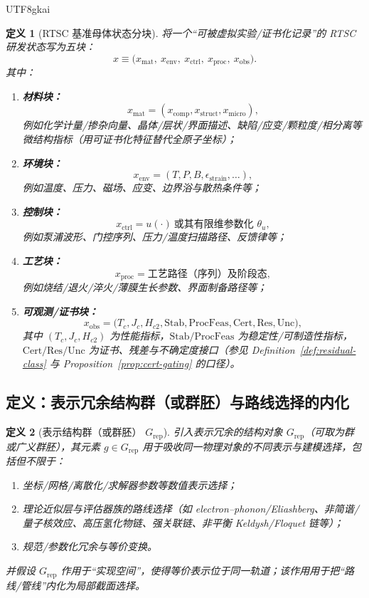 \documentclass[12pt]{article}
\newtheorem{definition}{定义}[section]
\newcommand{\RTSC}{\textsf{RTSC}}
\begin{document}
\begin{CJK*}{UTF8}{gkai}
\begin{definition}[RTSC 基准母体状态分块]
\label{def:rtsc-benchmark-blocks}
将一个“可被虚拟实验/证书化记录”的 \RTSC{} 研发状态写为五块：
\[
x
\equiv
\bigl(
x_{\mathrm{mat}},\ x_{\mathrm{env}},\ x_{\mathrm{ctrl}},\ x_{\mathrm{proc}},\ x_{\mathrm{obs}}
\bigr).
\]
其中：
\begin{enumerate}
  \item \textbf{材料块：}
  \[
  x_{\mathrm{mat}}=(x_{\mathrm{comp}},x_{\mathrm{struct}},x_{\mathrm{micro}}),
  \]
  例如化学计量/掺杂向量、晶体/层状/界面描述、缺陷/应变/颗粒度/相分离等微结构指标（用可证书化特征替代全原子坐标）；
  \item \textbf{环境块：}
  \[
  x_{\mathrm{env}}=(T,P,B,\epsilon_{\mathrm{strain}},\ldots),
  \]
  例如温度、压力、磁场、应变、边界浴与散热条件等；
  \item \textbf{控制块：}
  \[
  x_{\mathrm{ctrl}}=u(\cdot)\ \text{或其有限维参数化 }\theta_u,
  \]
  例如泵浦波形、门控序列、压力/温度扫描路径、反馈律等；
  \item \textbf{工艺块：}
  \[
  x_{\mathrm{proc}}=\text{工艺路径（序列）及阶段态},
  \]
  例如烧结/退火/淬火/薄膜生长参数、界面制备路径等；
  \item \textbf{可观测/证书块：}
  \[
  x_{\mathrm{obs}}=\bigl(T_c,J_c,H_{c2},\mathrm{Stab},\mathrm{ProcFeas},\mathrm{Cert},\mathrm{Res},\mathrm{Unc}\bigr),
  \]
  其中 $(T_c,J_c,H_{c2})$ 为性能指标，$\mathrm{Stab}/\mathrm{ProcFeas}$ 为稳定性/可制造性指标，$\mathrm{Cert}/\mathrm{Res}/\mathrm{Unc}$
    为证书、残差与不确定度接口（参见 Definition~\ref{def:residual-class} 与 Proposition~\ref{prop:cert-gating} 的口径）。
\end{enumerate}
\end{definition}

\subsection{定义：表示冗余结构群（或群胚）与路线选择的内化}

\begin{definition}[表示结构群（或群胚） $G_{\mathrm{rep}}$]
\label{def:g-rep}
引入表示冗余的结构对象 $G_{\mathrm{rep}}$（可取为群或广义群胚），其元素 $g\in G_{\mathrm{rep}}$ 用于吸收同一物理对象的不同表示与建模选择，包括但不限于：
\begin{enumerate}
  \item 坐标/网格/离散化/求解器参数等数值表示选择；
  \item 理论近似层与评估器族的路线选择（如 electron--phonon/Eliashberg、非简谐/量子核效应、高压氢化物链、强关联链、非平衡 Keldysh/Floquet 链等）；
  \item 规范/参数化冗余与等价变换。
\end{enumerate}
并假设 $G_{\mathrm{rep}}$ 作用于“实现空间”，使得等价表示位于同一轨道；该作用用于把“路线/管线”内化为局部截面选择。
\end{definition}


\end{CJK*}
\end{document}
